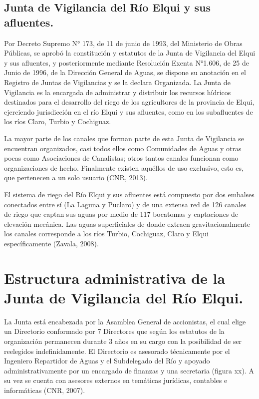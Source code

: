 \documentclass[11pt,]{article}
\begin{document}
\subsection{Junta de Vigilancia del Río Elqui y sus afluentes.}
Por Decreto Supremo N° 173, de 11 de junio de 1993, del Ministerio de Obras Públicas, se aprobó la constitución y estatutos de la Junta de Vigilancia del Elqui y sus afluentes, y posteriormente mediante Resolución Exenta N°1.606, de 25 de Junio de 1996, de la Dirección General de Aguas, se dispone su anotación en el Registro de Juntas de Vigilancias y se la declara Organizada. La Junta de Vigilancia es la encargada de administrar y distribuir los recursos hídricos destinados para el desarrollo del riego de los agricultores de la provincia de Elqui, ejerciendo jurisdicción en el río Elqui y sus afluentes, como en los subafluentes de los ríos Claro, Turbio y Cochiguaz.\bigskip 

La mayor parte de los canales que forman parte de esta Junta de Vigilancia se encuentran organizados, casi todos ellos como Comunidades de Aguas y otras pocas como Asociaciones de Canalistas; otros tantos canales funcionan como organizaciones de hecho. Finalmente existen aquéllos de uso exclusivo, esto es, que pertenecen a un solo usuario (CNR, 2013).\bigskip 

El sistema de riego del Río Elqui y sus afluentes está compuesto por dos embalses conectados entre sí (La Laguna y Puclaro) y de una extensa red de 126 canales de riego que captan sus aguas por medio de 117 bocatomas y captaciones de elevación mecánica. Las aguas superficiales de donde extraen gravitacionalmente los canales corresponde a los ríos Turbio, Cochiguaz, Claro y Elqui específicamente (Zavala, 2008).\bigskip 

\section{Estructura administrativa de la Junta de Vigilancia del Río Elqui.}
La Junta está encabezada por la Asamblea General de accionistas, el cual elige un Directorio conformado por 7 Directores que según los estatutos de la organización permanecen durante 3 años en su cargo con la posibilidad de ser reelegidos indefinidamente. El Directorio es asesorado técnicamente por el Ingeniero Repartidor de Aguas y el Subdelegado del Río y apoyado administrativamente por un encargado de finanzas y una secretaria (figura xx). A su vez se cuenta con asesores externos en temáticas jurídicas, contables e informáticas (CNR, 2007).
\end{document}
